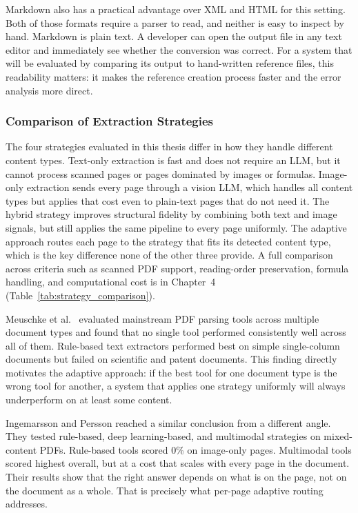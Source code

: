 \documentclass[12pt]{article}
\begin{document}
Markdown also has a practical advantage over XML and HTML for this setting.
Both of those formats require a parser to read, and neither is easy to inspect
by hand. Markdown is plain text. A developer can open the output file in any
text editor and immediately see whether the conversion was correct. For a
system that will be evaluated by comparing its output to hand-written reference
files, this readability matters: it makes the reference creation process
faster and the error analysis more direct.

\subsubsection{Comparison of Extraction Strategies}

The four strategies evaluated in this thesis differ in how they handle
different content types. Text-only extraction is fast and does not require
an LLM, but it cannot process scanned pages or pages dominated by images
or formulas. Image-only extraction sends every page through a vision LLM,
which handles all content types but applies that cost even to plain-text
pages that do not need it. The hybrid strategy improves structural fidelity
by combining both text and image signals, but still applies the same pipeline
to every page uniformly. The adaptive approach routes each page to the
strategy that fits its detected content type, which is the key difference
none of the other three provide. A full comparison across criteria such as
scanned PDF support, reading-order preservation, formula handling, and
computational cost is in Chapter~4 (Table~\ref{tab:strategy_comparison}).

Meuschke et al.\ \cite{meuschke2023} evaluated mainstream PDF parsing tools
across multiple document types and found that no single tool performed
consistently well across all of them. Rule-based text extractors performed best
on simple single-column documents but failed on scientific and patent documents.
This finding directly motivates the adaptive approach: if the best tool for one
document type is the wrong tool for another, a system that applies one strategy
uniformly will always underperform on at least some content.

Ingemarsson and Persson \cite{ingemarsson2024} reached a similar conclusion
from a different angle. They tested rule-based, deep learning-based, and
multimodal strategies on mixed-content PDFs. Rule-based tools scored 0\% on
image-only pages. Multimodal tools scored highest overall, but at a cost that
scales with every page in the document. Their results show that the right
answer depends on what is on the page, not on the document as a whole. That
is precisely what per-page adaptive routing addresses.
\end{document}
